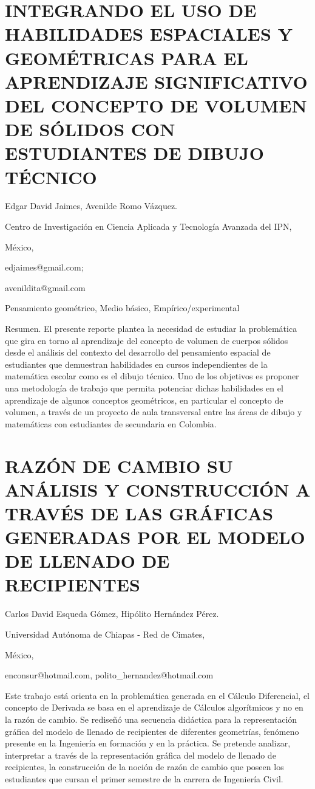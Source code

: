 \section{INTEGRANDO EL USO DE HABILIDADES ESPACIALES Y GEOMÉTRICAS PARA EL
APRENDIZAJE SIGNIFICATIVO DEL CONCEPTO DE VOLUMEN DE SÓLIDOS CON ESTUDIANTES
DE DIBUJO TÉCNICO}

\begin{datos}

Edgar David Jaimes, Avenilde Romo Vázquez.

Centro de Investigación en Ciencia Aplicada y Tecnología Avanzada
del IPN,

México,

edjaimes@gmail.com; 

avenildita@gmail.com

\end{datos}

Pensamiento geométrico, Medio básico, Empírico/experimental

Resumen. El presente reporte plantea la necesidad de estudiar la problemática
que gira en torno al aprendizaje del concepto de volumen de cuerpos
sólidos desde el análisis del contexto del desarrollo del pensamiento
espacial de estudiantes que demuestran habilidades en cursos independientes
de la matemática escolar como es el dibujo técnico. Uno de los objetivos
es proponer una metodología de trabajo que permita potenciar dichas
habilidades en el aprendizaje de algunos conceptos geométricos, en
particular el concepto de volumen, a través de un proyecto de aula
transversal entre las áreas de dibujo y matemáticas con estudiantes
de secundaria en Colombia.


\section{RAZÓN DE CAMBIO SU ANÁLISIS Y CONSTRUCCIÓN A TRAVÉS DE LAS GRÁFICAS
GENERADAS POR EL MODELO DE LLENADO DE RECIPIENTES}

\begin{datos}

Carlos David Esqueda Gómez, Hipólito Hernández Pérez.

Universidad Autónoma de Chiapas - Red de Cimates,

México,

enconsur@hotmail.com, polito\_hernandez@hotmail.com

\end{datos}

Este trabajo está orienta en la problemática generada en el Cálculo
Diferencial, el concepto de Derivada se basa en el aprendizaje de
Cálculos algorítmicos y no en la razón de cambio. Se rediseñó una
secuencia didáctica para la representación gráfica del modelo de llenado
de recipientes de diferentes geometrías, fenómeno presente en la Ingeniería
en formación y en la práctica. Se pretende analizar, interpretar a
través de la representación gráfica del modelo de llenado de recipientes,
la construcción de la noción de razón de cambio que poseen los estudiantes
que cursan el primer semestre de la carrera de Ingeniería Civil.


